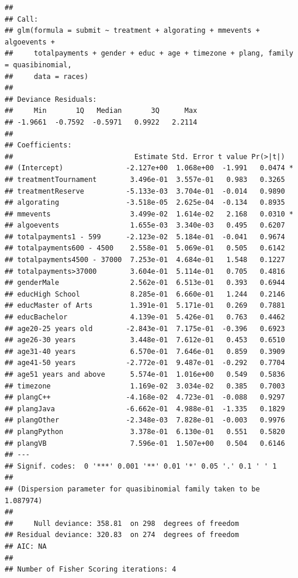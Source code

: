 \documentclass[12pt,]{article}
\theoremstyle{plain} %
\begin{document}
\begin{verbatim}
## 
## Call:
## glm(formula = submit ~ treatment + algorating + mmevents + algoevents + 
##     totalpayments + gender + educ + age + timezone + plang, family = quasibinomial, 
##     data = races)
## 
## Deviance Residuals: 
##     Min       1Q   Median       3Q      Max  
## -1.9661  -0.7592  -0.5971   0.9922   2.2114  
## 
## Coefficients:
##                             Estimate Std. Error t value Pr(>|t|)  
## (Intercept)               -2.127e+00  1.068e+00  -1.991   0.0474 *
## treatmentTournament        3.496e-01  3.557e-01   0.983   0.3265  
## treatmentReserve          -5.133e-03  3.704e-01  -0.014   0.9890  
## algorating                -3.518e-05  2.625e-04  -0.134   0.8935  
## mmevents                   3.499e-02  1.614e-02   2.168   0.0310 *
## algoevents                 1.655e-03  3.340e-03   0.495   0.6207  
## totalpayments1 - 599      -2.123e-02  5.184e-01  -0.041   0.9674  
## totalpayments600 - 4500    2.558e-01  5.069e-01   0.505   0.6142  
## totalpayments4500 - 37000  7.253e-01  4.684e-01   1.548   0.1227  
## totalpayments>37000        3.604e-01  5.114e-01   0.705   0.4816  
## genderMale                 2.562e-01  6.513e-01   0.393   0.6944  
## educHigh School            8.285e-01  6.660e-01   1.244   0.2146  
## educMaster of Arts         1.391e-01  5.171e-01   0.269   0.7881  
## educBachelor               4.139e-01  5.426e-01   0.763   0.4462  
## age20-25 years old        -2.843e-01  7.175e-01  -0.396   0.6923  
## age26-30 years             3.448e-01  7.612e-01   0.453   0.6510  
## age31-40 years             6.570e-01  7.646e-01   0.859   0.3909  
## age41-50 years            -2.772e-01  9.487e-01  -0.292   0.7704  
## age51 years and above      5.574e-01  1.016e+00   0.549   0.5836  
## timezone                   1.169e-02  3.034e-02   0.385   0.7003  
## plangC++                  -4.168e-02  4.723e-01  -0.088   0.9297  
## plangJava                 -6.662e-01  4.988e-01  -1.335   0.1829  
## plangOther                -2.348e-03  7.828e-01  -0.003   0.9976  
## plangPython                3.378e-01  6.130e-01   0.551   0.5820  
## plangVB                    7.596e-01  1.507e+00   0.504   0.6146  
## ---
## Signif. codes:  0 '***' 0.001 '**' 0.01 '*' 0.05 '.' 0.1 ' ' 1
## 
## (Dispersion parameter for quasibinomial family taken to be 1.087974)
## 
##     Null deviance: 358.81  on 298  degrees of freedom
## Residual deviance: 320.83  on 274  degrees of freedom
## AIC: NA
## 
## Number of Fisher Scoring iterations: 4
\end{verbatim}
\end{document}
